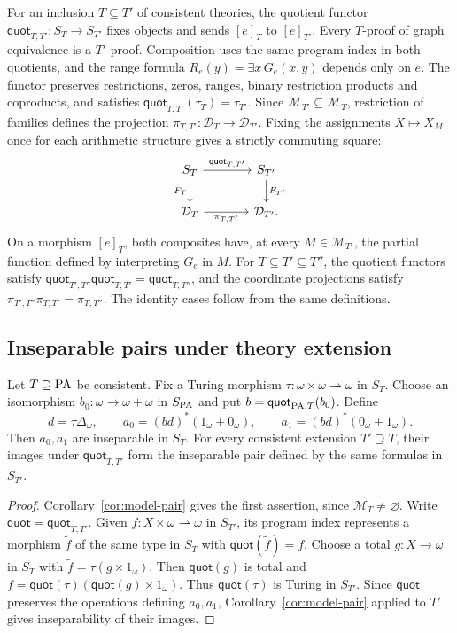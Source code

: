 For an inclusion $T\subseteq T'$ of consistent theories, the quotient
functor $\mathsf{quot}_{T,T'}:S_T\to S_{T'}$ fixes objects and sends
$[e]_T$ to $[e]_{T'}$. Every $T$-proof of graph equivalence is a
$T'$-proof. Composition uses the same program index in both quotients,
and the range formula $R_e(y)=\exists x\,G_e(x,y)$ depends only on $e$.
The functor preserves restrictions, zeros, ranges, binary restriction
products and coproducts, and satisfies $\mathsf{quot}_{T,T'}(\tau_T)=\tau_{T'}$.
Since $\mathcal M_{T'}\subseteq\mathcal M_T$, restriction of families
defines the projection
$\pi_{T,T'}:\mathcal D_T\to\mathcal D_{T'}$. Fixing the assignments
$X\mapsto X_M$ once for each arithmetic structure gives a strictly
commuting square:
\[
\begin{tikzcd}[column sep=large]
 S_T \arrow[r,"\mathsf{quot}_{T,T'}"] \arrow[d,"F_T"'] &
 S_{T'} \arrow[d,"F_{T'}"]\\
 \mathcal D_T \arrow[r,"\pi_{T,T'}"'] & \mathcal D_{T'}.
\end{tikzcd}
\]
On a morphism $[e]_T$, both composites have, at every
$M\in\mathcal M_{T'}$, the partial function defined by interpreting
$G_e$ in $M$. For $T\subseteq T'\subseteq T''$, the quotient
functors satisfy $\mathsf{quot}_{T',T''}\mathsf{quot}_{T,T'}=\mathsf{quot}_{T,T''}$, and the coordinate
projections satisfy
$\pi_{T',T''}\pi_{T,T'}=\pi_{T,T''}$.
The identity cases follow from the same definitions.

\subsection{Inseparable pairs under theory extension}

\begin{corollary}\label{cor:pair}
Let $T\supseteq\mathrm{PA}$ be consistent.
Fix a Turing morphism $\tau:\omega\times\omega\rightharpoonup\omega$ in $S_T$.
Choose an isomorphism $b_0:\omega\to\omega+\omega$ in $S_{\mathrm{PA}}$ and put
$b=\mathsf{quot}_{\mathrm{PA},T}(b_0)$. Define
\[
 d=\tau\Delta_\omega,\qquad
 a_0=(bd)^*(1_\omega+0_\omega),\qquad a_1=(bd)^*(0_\omega+1_\omega).
\]
Then $a_0,a_1$ are inseparable in $S_T$. For every consistent
extension $T'\supseteq T$, their images under $\mathsf{quot}_{T,T'}$ form the
inseparable pair defined by the same formulas in $S_{T'}$.
\end{corollary}
\begin{proof}
Corollary~\ref{cor:model-pair} gives the first assertion, since
$\mathcal M_T\ne\varnothing$.
Write $\mathsf{quot}=\mathsf{quot}_{T,T'}$. Given
$f:X\times\omega\rightharpoonup\omega$ in $S_{T'}$, its program
index represents a morphism $\tilde f$ of the same type in $S_T$ with
$\mathsf{quot}(\tilde f)=f$. Choose a total $g:X\to\omega$ in $S_T$
with $\tilde f=\tau(g\times1_\omega)$. Then $\mathsf{quot}(g)$ is
total and $f=\mathsf{quot}(\tau)(\mathsf{quot}(g)\times1_\omega)$.
Thus $\mathsf{quot}(\tau)$ is Turing in $S_{T'}$. Since
$\mathsf{quot}$ preserves the operations defining $a_0,a_1$,
Corollary~\ref{cor:model-pair} applied to $T'$ gives inseparability
of their images.
\end{proof}

